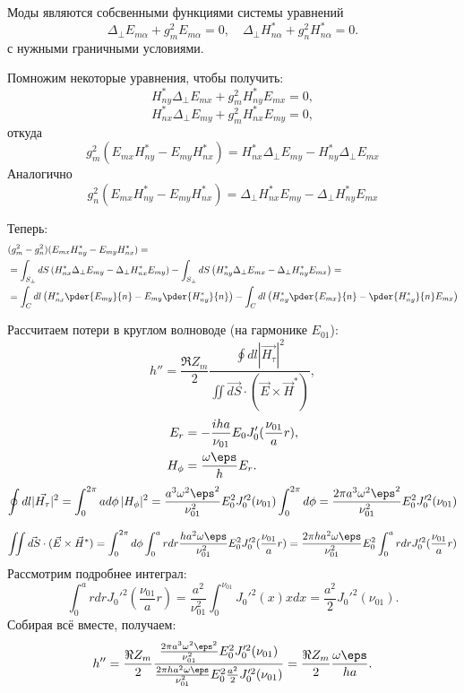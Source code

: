 Моды являются собсвенными функциями системы уравнений
\[
	\Delta_\perp E_{m\alpha} + g_m^2 E_{m\alpha} = 0,\quad \Delta_\perp H_{n\alpha}^* + g_n^2 H_{n\alpha}^* = 0.
\]
с нужными граничными условиями.

Помножим некоторые уравнения, чтобы получить:
\[
	H_{ny}^*\Delta_\perp E_{mx} + g_m^2 H_{ny}^*E_{mx} = 0,
\]
\[
	H_{nx}^*\Delta_\perp E_{my} + g_m^2 H_{nx}^*E_{my} = 0,
\]
откуда
\[
	g_m^2(E_{mx}H_{ny}^* - E_{my}H_{nx}^*) = H_{nx}^*\Delta_\perp E_{my} - H_{ny}^*\Delta_\perp E_{mx}
\]
Аналогично
\[
	g_n^2(E_{mx}H_{ny}^* - E_{my}H_{nx}^*) = \Delta_\perp H_{nx}^* E_{my} - \Delta_\perp H_{ny}^* E_{mx}
\]

Теперь:
\begin{align*}
	&(g_m^2 - g_n^2)(E_{mx}H_{ny}^* - E_{my}H_{nx}^*) =\\
	& = \int_{S_\perp} dS \left( H_{nx}^*\Delta_\perp E_{my} - \Delta_\perp H_{nx}^* E_{my} \right)
	-
	\int_{S_\perp} dS \left( H_{ny}^*\Delta_\perp E_{mx} - \Delta_\perp H_{ny}^* E_{mx} \right) =\\
	& = \int_C dl \left(H_{nx}^* \pder{E_{my}}{n} - E_{my}\pder{H_{ny}^*}{n}\right) -
	\int_C dl \left( H_{ny}^*\pder{E_{mx}}{n} - \pder{H_{ny}^*}{n} E_{mx} \right)
\end{align*}


Рассчитаем потери в круглом волноводе (на гармонике \(E_{01}\)):
\[
	h'' = \frac{\Re Z_m}{2}\frac{\oint dl |\vec{H_\tau}|^2}{\iint \vec{dS}\cdot(\vec{E}\times\vec{H}^*)},
\]
\begin{align*}
	E_r &= -\frac{iha}{\nu_{01}}E_0 J_0'(\frac{\nu_{01}}{a}r),\\
	H_\phi &= \frac{\omega\eps}{h}E_r.
\end{align*}
\[
	\oint dl |\vec{H_\tau}|^2 = \int_0^{2\pi} a d\phi\,|H_\phi|^2 =
	\frac{a^3\omega^2\eps^2}{\nu_{01}^2}E_0^2J_0'^2(\nu_{01})\int_0^{2\pi} d\phi = \frac{2\pi a^3\omega^2\eps^2}{\nu_{01}^2}E_0^2J_0'^2(\nu_{01})
\]

\[
	\iint \vec{dS}\cdot(\vec{E}\times\vec{H}^*) = \int_0^{2\pi}d\phi\int_0^a rdr \frac{ha^2\omega\eps}{\nu_{01}^2}E_0^2J_0'^2(\frac{\nu_{01}}{a}r)= \frac{2\pi ha^2\omega\eps}{\nu_{01}^2}E_0^2 \int_0^a rdrJ_0'^2(\frac{\nu_{01}}{a}r)
\]
Рассмотрим подробнее интеграл:
\[
	\int_0^a rdr J_0'^2(\frac{\nu_{01}}{a}r) =
	\frac{a^2}{\nu_{01}^2}\int_0^{\nu_{01}} J_0'^2(x) x dx =
	\frac{a^2}{2}J_0'^2(\nu_{01}).
\]
Собирая всё вместе, получаем:
\[
	h'' = \frac{\Re Z_m}{2}\frac{\frac{2\pi a^3\omega^2\eps^2}{\nu_{01}^2}E_0^2J_0'^2(\nu_{01})}{\frac{2\pi ha^2\omega\eps}{\nu_{01}^2}E_0^2\frac{a^2}{2}J_0'^2(\nu_{01})} = \frac{\Re Z_m}{2}\frac{\omega\eps}{ha}.
\]

